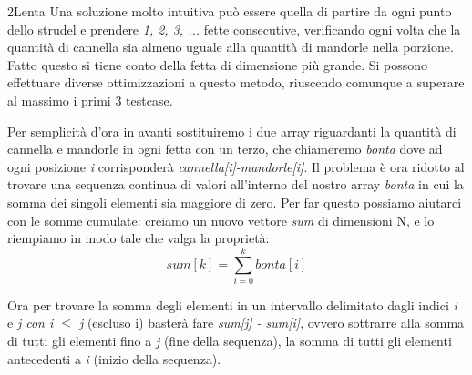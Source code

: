 
 
 \N2Lenta
 Una soluzione molto intuitiva può essere quella di partire da ogni punto dello strudel e prendere \textit{1, 2, 3, ...} fette consecutive, verificando ogni volta che la quantità di cannella sia almeno uguale alla quantità di mandorle nella porzione. Fatto questo si tiene conto della fetta di dimensione più grande.
Si possono effettuare diverse ottimizzazioni a questo metodo, riuscendo comunque a superare al massimo i primi 3 testcase.

\NlogN
Per semplicità d'ora in avanti sostituiremo i due array riguardanti la quantità di cannella e mandorle in ogni fetta con un terzo, che chiameremo \textit{bonta} dove ad ogni posizione \textit{i} corrisponderà \textit{cannella[i]-mandorle[i]}.
Il problema è ora ridotto al trovare una sequenza continua di valori all'interno del nostro array \textit{bonta} in cui la somma dei singoli elementi sia maggiore di zero.
Per far questo possiamo aiutarci con le somme cumulate:
creiamo un nuovo vettore \textit{sum} di dimensioni N, e lo riempiamo in modo tale che valga la proprietà:     \[sum[k] =  \sum_{i=0}^k bonta[i]\]

Ora per trovare la somma degli elementi in un intervallo delimitato dagli indici \textit{i} e \textit{j con i $\le$ j} (escluso i)  basterà fare \textit{sum[j] - sum[i]}, ovvero sottrarre  alla somma di tutti gli elementi fino a \textit{j} (fine della sequenza), la somma di tutti gli elementi antecedenti a \textit{i} (inizio della sequenza).

